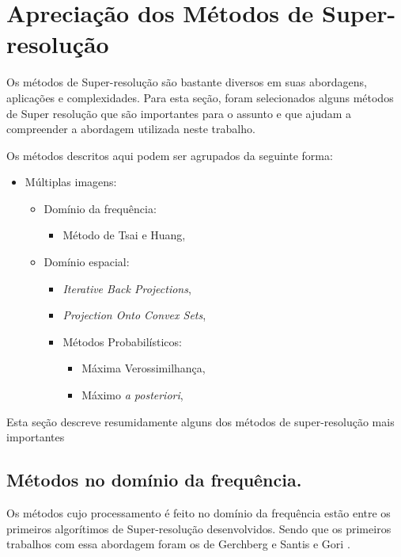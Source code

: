 \clearpage
\section{Apreciação dos Métodos de Super-resolução} 
\label{sec:srmetodos}
Os métodos de Super-resolução são bastante diversos em suas abordagens, aplicações e complexidades. Para esta seção, foram selecionados alguns métodos de Super resolução que são importantes para o assunto e que ajudam a compreender a abordagem utilizada neste trabalho.

Os métodos descritos aqui podem ser agrupados da seguinte forma:

\begin{itemize}
	\item Múltiplas imagens:
	\begin{itemize}
		\item Domínio da frequência:
		\begin{itemize}
			\item Método de Tsai e Huang,
		\end{itemize}
		\item Domínio espacial:
		\begin{itemize}
			\item \emph{Iterative Back Projections},
			\item \emph{Projection Onto Convex Sets},
			\item Métodos Probabilísticos:
			\begin{itemize}
				\item Máxima Verossimilhança,
				\item Máximo \emph{a posteriori},
			\end{itemize}
		\end{itemize}
	\end{itemize}
\end{itemize}

Esta seção descreve resumidamente alguns dos métodos de super-resolução mais importantes 

\subsection{Métodos no domínio da frequência.}

Os métodos cujo processamento é feito no domínio da frequência estão entre os primeiros algorítimos de Super-resolução desenvolvidos.
Sendo que os primeiros trabalhos com essa abordagem foram os de Gerchberg \cite{Gerchberg1974} e Santis e Gori \cite{de1975iterative}.

